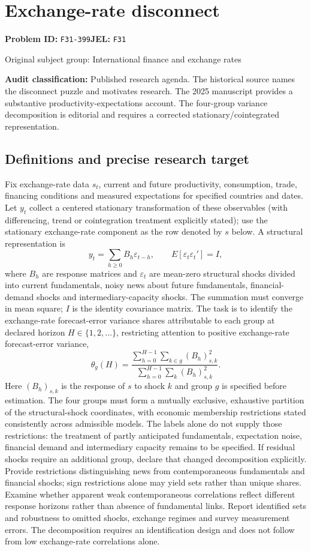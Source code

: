 \documentclass[11pt,a4paper]{article}
\begin{document}
\section*{Exchange-rate disconnect}
\textbf{Problem ID:} \texttt{F31-399}\quad \textbf{JEL:} \texttt{F31}\par
\label{problem:OP-0331}
{\sffamily\small\color{muted}Original subject group: International finance and exchange rates\par}
\label{definitions:problem:30007613}
\textbf{Audit classification:} Published research agenda. The historical source names the disconnect puzzle and motivates research. The 2025 manuscript provides a substantive productivity-expectations account. The four-group variance decomposition is editorial and requires a corrected stationary/cointegrated representation.
\subsection*{Definitions and precise research target}
Fix exchange-rate data \(s_t\), current and future productivity, consumption, trade, financing conditions and measured expectations for specified countries and dates. Let \(y_t\) collect a centered stationary transformation of these observables (with differencing, trend or cointegration treatment explicitly stated); use the stationary exchange-rate component as the row denoted by \(s\) below. A structural representation is
\[y_t=\sum_{h\geq0}B_h\varepsilon_{t-h},\qquad E[\varepsilon_t\varepsilon_t']=I,\]
where \(B_h\) are response matrices and \(\varepsilon_t\) are mean-zero structural shocks divided into current fundamentals, noisy news about future fundamentals, financial-demand shocks and intermediary-capacity shocks. The summation must converge in mean square; \(I\) is the identity covariance matrix. The task is to identify the exchange-rate forecast-error variance shares attributable to each group at declared horizon \(H\in\{1,2,\ldots\}\), restricting attention to positive exchange-rate forecast-error variance,
\[\theta_g(H)=\frac{\sum_{h=0}^{H-1}\sum_{k\in g}(B_h)_{s,k}^2}{\sum_{h=0}^{H-1}\sum_k(B_h)_{s,k}^2}.\]
Here \((B_h)_{s,k}\) is the response of \(s\) to shock \(k\) and group \(g\) is specified before estimation. The four groups must form a mutually exclusive, exhaustive partition of the structural-shock coordinates, with economic membership restrictions stated consistently across admissible models. The labels alone do not supply those restrictions: the treatment of partly anticipated fundamentals, expectation noise, financial demand and intermediary capacity remains to be specified. If residual shocks require an additional group, declare that changed decomposition explicitly. Provide restrictions distinguishing news from contemporaneous fundamentals and financial shocks; sign restrictions alone may yield sets rather than unique shares. Examine whether apparent weak contemporaneous correlations reflect different response horizons rather than absence of fundamental links. Report identified sets and robustness to omitted shocks, exchange regimes and survey measurement errors. The decomposition requires an identification design and does not follow from low exchange-rate correlations alone.
\end{document}
